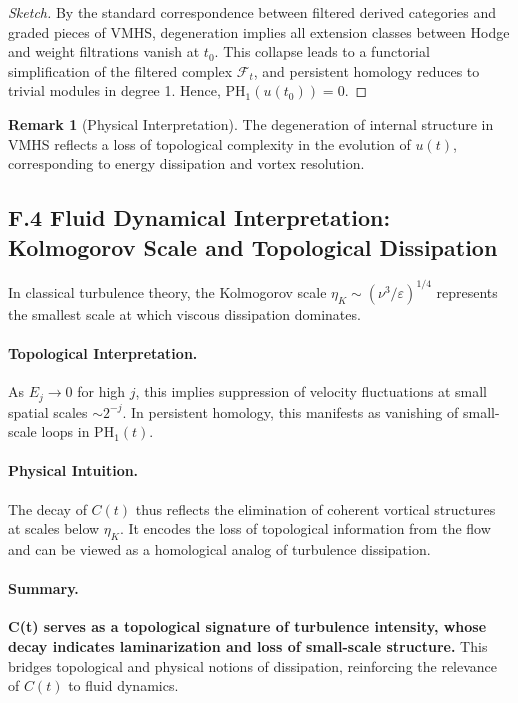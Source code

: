 \documentclass[11pt]{article}
\theoremstyle{definition}
\newtheorem{remark}[theorem]{Remark}
\begin{document}
\begin{proof}[Sketch]
By the standard correspondence between filtered derived categories and graded pieces of VMHS,  
degeneration implies all extension classes between Hodge and weight filtrations vanish at $t_0$.  
This collapse leads to a functorial simplification of the filtered complex $\mathcal{F}_t$,  
and persistent homology reduces to trivial modules in degree 1.  
Hence, $\mathrm{PH}_1(u(t_0)) = 0$.
\end{proof}

\begin{remark}[Physical Interpretation]
The degeneration of internal structure in VMHS reflects a loss of topological complexity  
in the evolution of \( u(t) \), corresponding to energy dissipation and vortex resolution.
\end{remark}


\subsection*{F.4 Fluid Dynamical Interpretation: Kolmogorov Scale and Topological Dissipation}

In classical turbulence theory, the Kolmogorov scale \( \eta_K \sim (\nu^3 / \varepsilon)^{1/4} \) represents the smallest scale at which viscous dissipation dominates.

\paragraph{Topological Interpretation.} As \( E_j \to 0 \) for high \( j \), this implies suppression of velocity fluctuations at small spatial scales \( \sim 2^{-j} \). In persistent homology, this manifests as vanishing of small-scale loops in \( \mathrm{PH}_1(t) \).

\paragraph{Physical Intuition.} The decay of \( C(t) \) thus reflects the elimination of coherent vortical structures at scales below \( \eta_K \). It encodes the loss of topological information from the flow and can be viewed as a homological analog of turbulence dissipation.

\paragraph{Summary.} \textbf{C(t) serves as a topological signature of turbulence intensity, whose decay indicates laminarization and loss of small-scale structure.} This bridges topological and physical notions of dissipation, reinforcing the relevance of \( C(t) \) to fluid dynamics.
\end{document}
